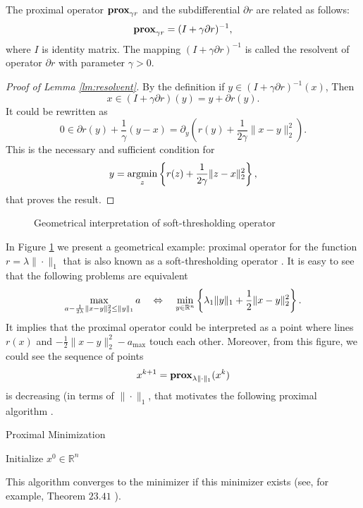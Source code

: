 {\begin{lemma}[Resolvent]\label{lm:resolvent}
    The proximal operator $\mathbf{prox}_{\gamma r}$ and the subdifferential $\partial r$ are related as follows:
    \begin{equation}\label{eq:resolvent}
        \mathbf{prox}_{\gamma r} = (I+\gamma\partial r)^{-1}, 
    \end{equation}
    where $I$ is identity matrix.
    The mapping $(I+\gamma\partial r)^{-1}$ is called the resolvent of operator $\partial r$ with parameter $\gamma>0$.
\end{lemma}
\begin{proof}[Proof of Lemma \ref{lm:resolvent}]
By the definition if $y\in (I+\gamma\partial r)^{-1}(x)$, Then
$$
x\in (I+\gamma\partial r)(y) = y + \partial r(y).
$$
It could be rewritten as
$$
0\in \partial r(y) + \frac{1}{\gamma}(y-x) = \partial_y \left(r(y) + \frac{1}{2\gamma}\|x-y\|_2^2\right).
$$
This is the necessary and sufficient condition for 
$$
y = \operatorname*{argmin}_z\left\{r(z) + \frac{1}{2\gamma}\|z-x\|_2^2\right\},
$$
that proves the result.
\end{proof}
}
\begin{figure}[h]
    \centering

    \caption{Geometrical interpretation of soft-thresholding operator}
    \label{fig:prox_l1}
\end{figure}

In Figure \ref{fig:prox_l1} we present a geometrical example: proximal operator for the function $r = \lambda\|\cdot\|_1$ that is also known as a soft-thresholding operator \cite{donoho1995noising}. It is easy to see that the following problems are equivalent 
$$
\max_{a - \frac{1}{2\lambda}\|x-y\|_2^2\leq\|y\|_1} a ~~~\Leftrightarrow~~~\min_{y\in\mathbb{R}^n}\left\{\lambda_1\|y\|_1 + \frac{1}{2}\|x-y\|_2^2\right\}.
$$
It implies that the proximal operator could be interpreted as a point where lines $r(x)$ and $-\frac{1}{2}\|x-y\|_2^2-a_{\max}$ touch each other. Moreover, from this figure, we could see the sequence of points 
$$
x^{k+1} = \mathbf{prox}_{\lambda\|\cdot\|_1}(x^k)
$$
is decreasing (in terms of $\|\cdot\|_1$, that motivates the following proximal algorithm \cite{rockafellar1976monotone}.

\begin{algorithm}
    \caption{Proximal Minimization}
    \label{algo:pm}
    \begin{algorithmic}
        \STATE Initialize $x^0\in\mathbb{R}^n$
        \ENDFOR
    \end{algorithmic}
\end{algorithm}

This algorithm converges to the minimizer if this minimizer exists (see, for example, Theorem $23.41$ \cite{bauschke2011convex}).
